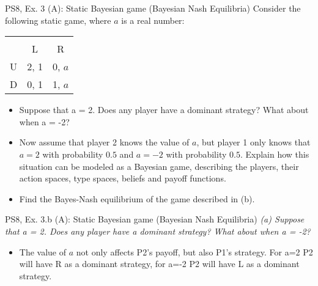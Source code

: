 \begin{frame}{PS8, Ex. 3 (A): Static Bayesian game (Bayesian Nash Equilibria)}
Consider the following static game, where $a$ is a real number:
    \begin{table}
      \begin{tabular}{l|c|c|}
        \multicolumn{1}{c}{} & \multicolumn{2}{c}{} \\
        \multicolumn{1}{c}{} & \multicolumn{1}{c}{L} & \multicolumn{1}{c}{R} \\\cline{2-3}
        U & 2, 1 & 0, $a$ \\\cline{2-3}
        D & 0, 1 & 1, $a$ \\\cline{2-3}
      \end{tabular}
    \end{table}
    \begin{itemize}
        \item[(a)] Suppose that a = 2. Does any player have a dominant strategy? What about when a = -2?
        \item[(b)] Now assume that player 2 knows the value of $a$, but player 1 only knows that $a = 2$ with probability $0.5$ and $a = −2$ with probability $0.5$. Explain how this situation can be modeled as a Bayesian game, describing the players, their action spaces, type spaces, beliefs and payoff functions.
        \item[(c)] Find the Bayes-Nash equilibrium of the game described in (b).
    \end{itemize}
    \vfill\null
\end{frame}

\begin{frame}{PS8, Ex. 3.b (A): Static Bayesian game (Bayesian Nash Equilibria)}
    \vspace{-20pt}
    \textit{(a) Suppose that a = 2. Does any player have a dominant strategy? What about when a = -2?}
    \vspace{-8pt}
  \begin{multicols}{2}
    \begin{itemize}
    \item[(a)] The value of $a$ not only affects P2's payoff, but also P1's strategy. For a=2 P2 will have R as a dominant strategy, for a=-2 P2 will have L as a dominant strategy.
    \end{itemize}
    \vfill\null\columnbreak
    \vfill\null
  \end{multicols}
   \vfill\null
\end{frame}


